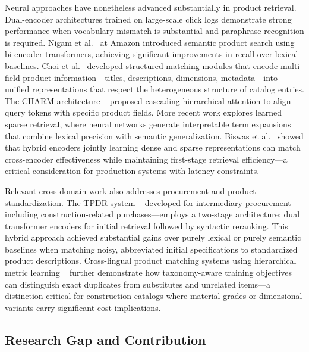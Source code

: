 \documentclass[preprint,12pt]{elsarticle}
\begin{document}
Neural approaches have nonetheless advanced substantially in product retrieval. Dual-encoder architectures trained on large-scale click logs demonstrate strong performance when vocabulary mismatch is substantial and paraphrase recognition is required. Nigam et al.~\cite{nigamSemanticProductSearch2019a} at Amazon introduced semantic product search using bi-encoder transformers, achieving significant improvements in recall over lexical baselines. Choi et al.~\cite{choiSemanticProductSearch2020} developed structured matching modules that encode multi-field product information—titles, descriptions, dimensions, metadata—into unified representations that respect the heterogeneous structure of catalog entries. The CHARM architecture ~\cite{freymuthHierarchicalMultifieldRepresentations2025} proposed cascading hierarchical attention to align query tokens with specific product fields. More recent work explores learned sparse retrieval, where neural networks generate interpretable term expansions that combine lexical precision with semantic generalization. Biswas et al.~\cite{biswasEfficientInterpretableInformation2024} showed that hybrid encoders jointly learning dense and sparse representations can match cross-encoder effectiveness while maintaining first-stage retrieval efficiency—a critical consideration for production systems with latency constraints.

Relevant cross-domain work also addresses procurement and product standardization. The TPDR system ~\cite{cunhaTPDRNovelTwoStep2023} developed for intermediary procurement—including construction-related purchases—employs a two-stage architecture: dual transformer encoders for initial retrieval followed by syntactic reranking. This hybrid approach achieved substantial gains over purely lexical or purely semantic baselines when matching noisy, abbreviated initial specifications to standardized product descriptions. Cross-lingual product matching systems using hierarchical metric learning ~\cite{kooDeepMetricLearning2023} further demonstrate how taxonomy-aware training objectives can distinguish exact duplicates from substitutes and unrelated items—a distinction critical for construction catalogs where material grades or dimensional variants carry significant cost implications.

\subsection{Research Gap and Contribution}
\end{document}
